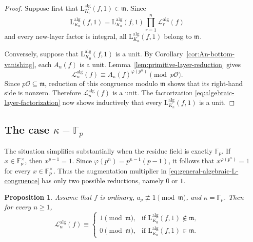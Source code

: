 \documentclass[11pt,table]{amsart}
\newtheorem{proposition}[theorem]{Proposition}
\newcommand{\F}{\mathbb{F}}
\numberwithin{equation}{section}
\begin{document}
\begin{proof}
Suppose first that
\(\mathrm{L}_{K_0}^{\operatorname{alg}}(f,1)\in\mathfrak m\). Since
\[
        \mathrm{L}_{K_n}^{\operatorname{alg}}(f,1)
        =
        \mathrm{L}_{K_0}^{\operatorname{alg}}(f,1)
        \prod_{r=1}^{n}\mathscr L_r^{\operatorname{alg}}(f)
\]
and every new-layer factor is integral, all
\(\mathrm{L}_{K_n}^{\operatorname{alg}}(f,1)\) belong to
\(\mathfrak m\).

Conversely, suppose that $\mathrm{L}_{K_0}^{\operatorname{alg}}(f,1)$ is a unit. By
Corollary~\ref{cor:An-bottom-vanishing}, each \(A_n(f)\) is a unit.
Lemma~\ref{lem:primitive-layer-reduction} gives
\[
        \mathscr L_n^{\operatorname{alg}}(f)
        \equiv
        A_n(f)^{\varphi(p^n)}
        \pmod{p\mathcal O}.
\]
Since \(p\mathcal O\subseteq\mathfrak m\), reduction of this congruence
modulo \(\mathfrak m\) shows that its right-hand side is nonzero.
Therefore \(\mathscr L_n^{\operatorname{alg}}(f)\) is a unit. The
factorization \eqref{eq:algebraic-layer-factorization} now shows
inductively that every
\(\mathrm{L}_{K_n}^{\operatorname{alg}}(f,1)\) is a unit.
\end{proof}

\subsection{The case \(\kappa=\F_p\)}

\par The situation simplifies substantially when the residue field is
exactly \(\F_p\). If \(x\in\F_p^\times\), then \(x^{p-1}=1\). Since
\(\varphi(p^n)=p^{n-1}(p-1)\), it follows that
\(x^{\varphi(p^n)}=1\) for every \(x\in\F_p^\times\). Thus the
augmentation multiplier in
\eqref{eq:general-algebraic-L-congruence} has only two possible
reductions, namely \(0\) or \(1\).

\begin{proposition}
\label{prop:new-layer-zero-one}
Assume that \(f\) is ordinary,
\(a_p\not\equiv1\pmod{\mathfrak m}\), and \(\kappa=\F_p\). Then for
every \(n\geq1\),
\begin{equation}
\label{eq:new-layer-zero-one}
        \mathscr L_n^{\operatorname{alg}}(f)
        \equiv
        \begin{cases}
        1\pmod{\mathfrak m},
        &\text{if }\mathrm{L}_{K_0}^{\operatorname{alg}}(f,1)
        \notin\mathfrak m,\\[4pt]
        0\pmod{\mathfrak m},
        &\text{if }\mathrm{L}_{K_0}^{\operatorname{alg}}(f,1)
        \in\mathfrak m.
        \end{cases}
\end{equation}
\end{proposition}
\end{document}
